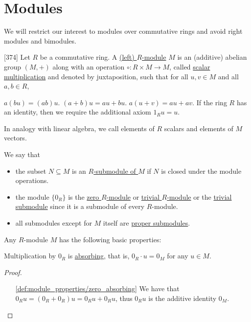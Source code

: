 \section{Modules}\label{sec:modules}

\begin{note}\label{note:module_over_commutative_ring}
  We will restrict our interest to modules over commutative rings and avoid right modules and bimodules.
\end{note}

\begin{definition}\label{def:module}\cite{Knapp2016BAlg}[374]
  Let $R$ be a commutative ring. A \uline{(left) $R$-module} $M$ is an (additive) abelian group $(M, +)$ along with an operation $\circ: R \times M \to M$, called \uline{scalar multiplication} and denoted by juxtaposition, such that for all $u, v \in M$ and all $a, b \in R$,
  \begin{description}
     $a (b u) = (a b) u$.
     $(a + b) u = a u + b u$.
     $a (u + v) = a u + a v$.
     If the ring $R$ has an identity, then we require the additional axiom $1_R u = u$.
  \end{description}

  In analogy with linear algebra, we call elements of $R$ scalars and elements of $M$ vectors.

  We say that
  \begin{itemize}
    \item the subset $N \subseteq M$ is an \uline{$R$-submodule of $M$} if $N$ is closed under the module operations.
    \item the module $\{ 0_R \}$ is the \uline{zero $R$-module} or \uline{trivial $R$-module} or the \uline{trivial submodule} since it is a submodule of every $R$-module.
    \item all submodules except for $M$ itself are \uline{proper submodules}.
  \end{itemize}
\end{definition}

\begin{proposition}\label{def:module_properties}
  Any $R$-module $M$ has the following basic properties:
  \begin{defenum}
    \item\label{def:module_properties/zero_absorbing} Multiplication by $0_R$ is \uline{absorbing}, that is, $0_R \cdot u = 0_M$ for any $u \in M$.
  \end{defenum}
\end{proposition}
\begin{proof}\mbox{}
  \begin{itemize}
    \item[\ref{def:module_properties/zero_absorbing}] We have that $0_R u = (0_R + 0_R)u = 0_R u + 0_R u$, thus $0_R u$ is the additive identity $0_M$.
  \end{itemize}
\end{proof}

